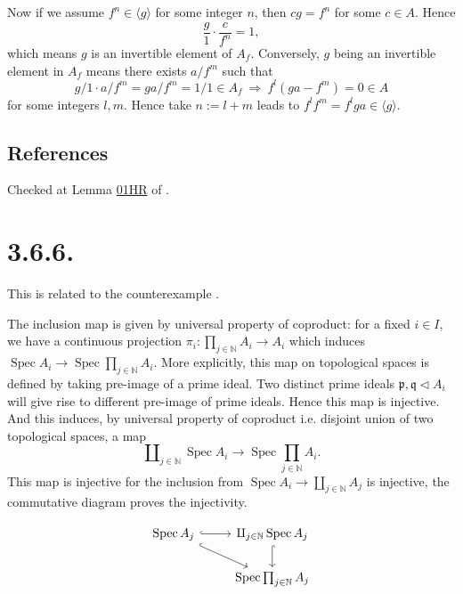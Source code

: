 Now if we assume $f^n\in\langle g\rangle$ for some integer $n$, then $cg=f^n$ for some $c\in A$. Hence 
\[\frac{g}{1}\cdot \frac{c}{f^n}=1,\] which means $g$ is an invertible element of $A_f$. Conversely, $g$ being an invertible element in $A_f$ means there exists $a/f^m$ such that 
\[g/1\cdot a/f^m=ga/f^m=1/1\in A_f ~\Rightarrow~ f^{l}(ga-f^m)=0\in A\] for some integers $l,m$. Hence take $n:=l+m$ leads to $f^lf^m=f^lga\in \langle g\rangle$.

\subsection{References}

Checked at Lemma \href{https://stacks.math.columbia.edu/tag/01HR}{01HR} of \cite{stacks-project}.


\section{3.6.6.}


This is related to the counterexample .

The inclusion map is given by universal property of coproduct:
for a fixed $i\in I$, we have a continuous projection $\pi_i:\prod_{j\in\mathbb N}A_i\to A_i$ which induces $\operatorname{Spec}A_i\to \operatorname{Spec}\prod_{j\in\mathbb N}A_i$. More explicitly, this map on topological spaces is defined by taking pre-image of a prime ideal. Two distinct prime ideals $\mathfrak p,\mathfrak q\triangleleft A_i$ will give rise to different pre-image of prime ideals. Hence this map is injective. And this induces, by universal property of coproduct i.e. disjoint union of two topological spaces, a map \[\amalg_{j\in\mathbb N}\operatorname{Spec}A_i \to \operatorname{Spec}\prod_{j\in\mathbb N}A_i.\] This map is injective for the inclusion from $\operatorname{Spec}A_i\to\amalg_{j\in\mathbb N}A_j$ is injective, the commutative diagram proves the injectivity.

\[\begin{tikzcd}
	{\operatorname{Spec}A_j} & {\amalg_{j\in\mathbb N}\operatorname{Spec}A_j} \\
	& {\operatorname{Spec}\prod_{j\in \mathbb N}A_j}
	\arrow[hook, from=1-1, to=1-2]
	\arrow[hook, from=1-1, to=2-2]
	\arrow[hook, from=1-2, to=2-2]
\end{tikzcd}\]

